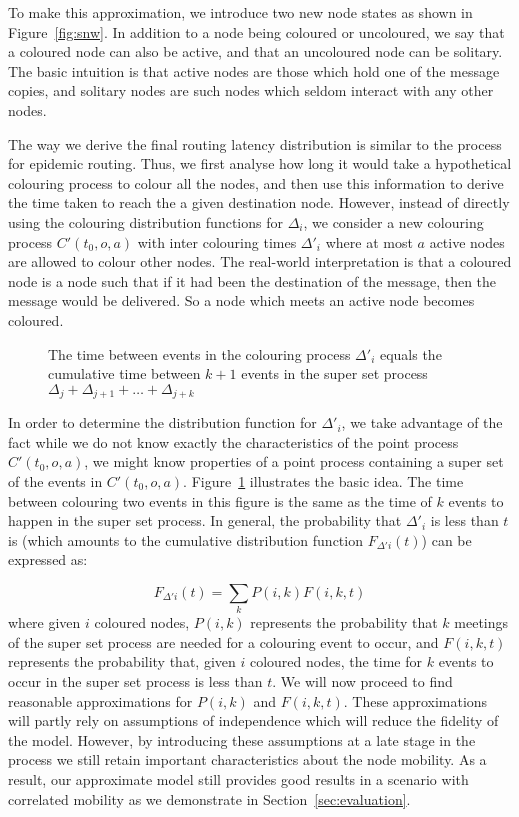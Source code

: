 \documentclass{article}
\begin{document}
To make this approximation, we introduce two new node states as shown in
Figure~\ref{fig:snw}. In addition to a node being coloured or
uncoloured, we say that a coloured node can also be active, and that
an uncoloured node can be solitary. The basic intuition is that active
nodes are those which hold one of the message copies, and solitary
nodes are such nodes which seldom interact with any other nodes. 

The way we derive the final routing latency distribution is similar to
the process for epidemic routing. Thus, we first analyse how long it
would take a hypothetical colouring process to colour all the nodes,
and then use this information to derive the time taken to reach the a
given destination node. However, instead of directly using the
colouring distribution functions for $\Delta_i$, we consider a new
colouring process $C'(t_0,o,a)$ with inter colouring times $\Delta'_i$
where at most $a$ active nodes are allowed to colour other nodes. The
real-world interpretation is that a coloured node is a node such that
if it had been the destination of the message, then the message would
be delivered. So a node which meets an active node becomes coloured.

\begin{figure}[ht]
  \centering
  \caption{The time between events in the colouring process $\Delta'_i$ equals the cumulative time between $k+1$ events in the super set process $\Delta_j + \Delta_{j+1} + \ldots + \Delta_{j+k}$  }
  \label{fig:multicopy}
\end{figure}

In order to determine the distribution function for $\Delta'_i$, we
take advantage of the fact while we do not know exactly the
characteristics of the point process $C'(t_0,o,a)$, we might know
properties of a point process containing a super set of the events in
$C'(t_0,o,a)$. Figure~\ref{fig:multicopy} illustrates the basic
idea. The time between colouring two events in this figure is the same 
as the time of $k$ events to happen in the super set process. In
general, the probability that $\Delta'_i$ is less than $t$ is (which
amounts to the cumulative distribution function $F_{\Delta' i}(t)$)
can be expressed as:

\begin{equation}
  \label{eq:superset}
  F_{\Delta' i}(t) = \sum_k P(i,k)F(i,k,t)
\end{equation}
where given $i$ coloured nodes, $P(i,k)$ represents the probability
that $k$ meetings of the super set process are needed for a colouring
event to occur, and $F(i,k,t)$ represents the probability that, given
$i$ coloured nodes, the time for $k$ events to occur in the super set
process is less than $t$. We will now proceed to find reasonable
approximations for $P(i,k)$ and $F(i,k,t)$. These approximations will
partly rely on assumptions of independence which will reduce the
fidelity of the model. However, by introducing these assumptions at a
late stage in the process we still retain important characteristics
about the node mobility. As a result, our approximate model still
provides good results in a scenario with correlated mobility as we
demonstrate in Section~\ref{sec:evaluation}.
\end{document}
